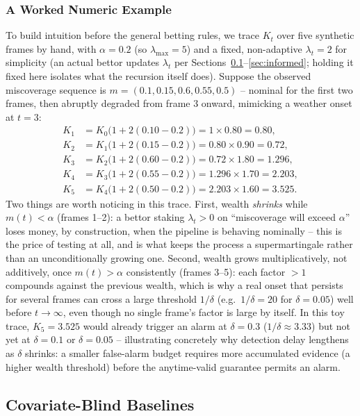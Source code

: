 \subsubsection{A Worked Numeric Example}
\label{sec:worked-example}
To build intuition before the general betting rules, we trace $K_t$ over five synthetic frames by hand, with $\alpha = 0.2$ (so $\lambda_{\max} = 5$) and a fixed, non-adaptive $\lambda_t = 2$ for simplicity (an actual bettor updates $\lambda_t$ per Sections~\ref{sec:blind}--\ref{sec:informed}; holding it fixed here isolates what the recursion itself does). Suppose the observed miscoverage sequence is $m = (0.1, 0.15, 0.6, 0.55, 0.5)$ -- nominal for the first two frames, then abruptly degraded from frame 3 onward, mimicking a weather onset at $t=3$:
\begin{align*}
K_1 &= K_0 \big(1 + 2(0.10 - 0.2)\big) = 1 \times 0.80 = 0.80, \\
K_2 &= K_1 \big(1 + 2(0.15 - 0.2)\big) = 0.80 \times 0.90 = 0.72, \\
K_3 &= K_2 \big(1 + 2(0.60 - 0.2)\big) = 0.72 \times 1.80 = 1.296, \\
K_4 &= K_3 \big(1 + 2(0.55 - 0.2)\big) = 1.296 \times 1.70 = 2.203, \\
K_5 &= K_4 \big(1 + 2(0.50 - 0.2)\big) = 2.203 \times 1.60 = 3.525.
\end{align*}
Two things are worth noticing in this trace. First, wealth \emph{shrinks} while $m(t) < \alpha$ (frames 1--2): a bettor staking $\lambda_t > 0$ on ``miscoverage will exceed $\alpha$'' loses money, by construction, when the pipeline is behaving nominally -- this is the price of testing at all, and is what keeps the process a supermartingale rather than an unconditionally growing one. Second, wealth grows multiplicatively, not additively, once $m(t) > \alpha$ consistently (frames 3--5): each factor $> 1$ compounds against the previous wealth, which is why a real onset that persists for several frames can cross a large threshold $1/\delta$ (e.g.\ $1/\delta = 20$ for $\delta = 0.05$) well before $t \to \infty$, even though no single frame's factor is large by itself. In this toy trace, $K_5 = 3.525$ would already trigger an alarm at $\delta = 0.3$ ($1/\delta \approx 3.33$) but not yet at $\delta = 0.1$ or $\delta = 0.05$ -- illustrating concretely why detection delay lengthens as $\delta$ shrinks: a smaller false-alarm budget requires more accumulated evidence (a higher wealth threshold) before the anytime-valid guarantee permits an alarm.

\subsection{Covariate-Blind Baselines}
\label{sec:blind}

